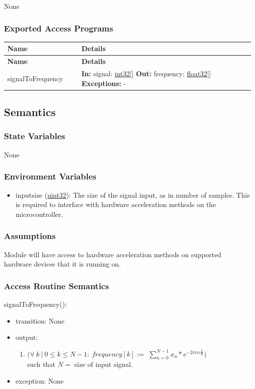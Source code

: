 \documentclass[12pt, titlepage]{article}
\newenvironment{apitable}{%
\begin{center}
\begin{longtable}{|p{0.3\linewidth}|p{0.7\linewidth}|} 
\hline
\textbf{Name} & \textbf{Details} \\
\hline
\endfirsthead
\hline
\textbf{Name} & \textbf{Details} \\
\hline
\endhead
\hline
\endfoot
\hline
\endlastfoot
}{%
\end{longtable}
\end{center}
}
\newcommand{\apifunc}[4]{%
#1 & 
\textbf{In:} #2 \newline
\textbf{Out:} #3 \newline
\textbf{Exceptions:} #4 \\
\hline
}
\begin{document}
None

\subsubsection{Exported Access Programs}
\begin{apitable}
  \apifunc{signalToFrequency}
    {signal: \hyperref[generic:int32]{int32}[]}
    {frequency: \hyperref[generic:float32]{float32}[]}
    {-}
\end{apitable}

\subsection{Semantics}

\subsubsection{State Variables}

None

\subsubsection{Environment Variables}

\begin{itemize}
  \item inputsize (\hyperref[generic:uint32]{uint32}):
    The size of the signal input, as in number of
     samples. This is required to interface with hardware acceleration methods
     on the microcontroller.
\end{itemize}

\subsubsection{Assumptions}

Module will have access to hardware acceleration methods on supported hardware
devices that it is running on.

\subsubsection{Access Routine Semantics}

\noindent signalToFrequency():
\begin{itemize}
\item transition: None
\item output:
  \begin{enumerate}
    \item $(\forall~k~|~0 \leq k \leq N - 1:~frequency[k] := $ $\sum_{n=0}^{N-1}
    x_n * e^{-2i \pi n \frac{k}{N}})$ \\
    such that $N = $ size of input signal.
  \end{enumerate}
\item exception: None
\end{itemize}
\end{document}
